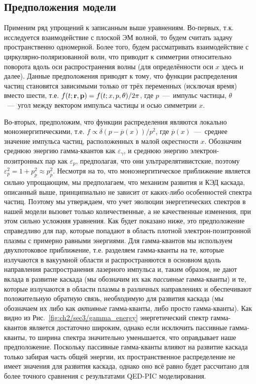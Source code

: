 \subsection{Предположения модели}
\label{sub:ch2/sec3/Assumptions}
Применим ряд упрощений к записанным выше уравнениям.
Во-первых, т.к. исследуется взаимодействие с плоской ЭМ волной, то будем считать задачу пространственно одномерной.
Более того, будем рассматривать взаимодействие с циркулярно-поляризованной волн, что приводит к симметрии относительно поворота вдоль оси распространения волны (для определённости оси $x$ здесь и далее).
Данные предположения приводят к тому, что функции распределения частиц становятся зависимыми только от трёх переменных (исключая время) вместо шести, т.е. $f(t;\vb{r},\vb{p})=f(t;x,p,\theta)/2\pi$, где $p$~---~импульс частицы, $\theta$~---~угол между вектором импульса частицы и осью симметрии $x$.

Во-вторых, предположим, что функции распределения являются локально моноэнергитическими, т.е. $f\propto\delta(p-\overline{p}(x))/p^2$, где $\overline{p}(x)$~---~среднее значение импульса частиц, расположенных в малой окрестности $x$.
Обозначим среднюю энергию гамма-квантов как $\varepsilon_\gamma$, и среднюю энергию электрон-позитронных пар как $\varepsilon_p$, предполагая, что они ультрарелятивистские, поэтому $\varepsilon_p^2 = 1+p_p^2\approx p_p^2$.
Несмотря на то, что моноэнергитическое приближение является сильно упрощающим, мы предполагаем, что механизм развития и КЭД каскада, описанный выше, принципиально не зависит от каких-либо особенностей спектра частиц.
Поэтому мы утверждаем, что учет эволюции энергетических спектров в нашей модели вызовет только количественные, а не качественные изменения, при этом сильно усложняя уравнения.
Как будет показано ниже, это предположение справедливо для пар, которые попадают в область плотной электрон-позитронной плазмы с примерно равными энергиями.
Для гамма-квантов мы используем двухпотоковое приближение, т.е. разделяем гамма-кванты на те, которые излучаются в вакуумной области и распространяются в основном вдоль направления распространения лазерного импульса и, таким образом, не дают вклада в развитие каскада (мы обозначим их как \textit{пассивные} гамма-кванты) и те, которые излучаются в области плазмы в различных направлениях и обеспечивают положительную обратную связь, необходимую для развития каскада (мы обозначаем их либо как \textit{активные} гамма-кванты, либо просто гамма-кванты).
Как видно из Рис.~\ref{fig:ch2/sec3/gamma_energy} энергетический спектр гамма-квантов является достаточно широким, однако если исключить пассивные гамма-кванты, то ширина спектра значительно уменьшается, что оправдывает наше предположение.
Поскольку пассивные гамма-кванты влияют на развитие каскада только забирая часть общей энергии, их пространственное распределение не имеет значения для развития каскада, однако оно всё равно будет рассчитано для более точного сравнения с результатами QED-PIC моделирования.

